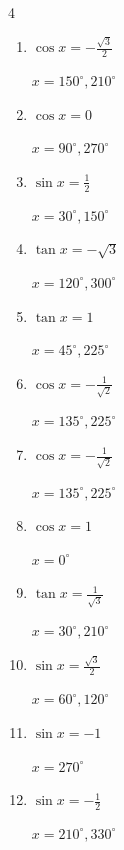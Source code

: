 \begin{multicols}{4}
\begin{enumerate}
  \item $\displaystyle \cos{x}  = -\frac{\sqrt{3}}{2}$

        $\displaystyle x = 150^{\circ} , 210^{\circ}$

  \item $\displaystyle \cos{x}  = 0$

        $\displaystyle x = 90^{\circ} , 270^{\circ}$

  \item $\displaystyle \sin{x}  = \frac{1}{2}$

        $\displaystyle x = 30^{\circ} , 150^{\circ}$

  \item $\displaystyle \tan{x}  = -\sqrt{3}$

        $\displaystyle x = 120^{\circ} , 300^{\circ}$

  \item $\displaystyle \tan{x}  = 1$

        $\displaystyle x = 45^{\circ} , 225^{\circ}$

  \item $\displaystyle \cos{x}  = -\frac{1}{\sqrt{2}}$

        $\displaystyle x = 135^{\circ} , 225^{\circ}$

  \item $\displaystyle \cos{x}  = -\frac{1}{\sqrt{2}}$

        $\displaystyle x = 135^{\circ} , 225^{\circ}$

  \item $\displaystyle \cos{x}  = 1$

        $\displaystyle x = 0^{\circ}$

  \item $\displaystyle \tan{x}  = \frac{1}{\sqrt{3}}$

        $\displaystyle x = 30^{\circ} , 210^{\circ}$

  \item $\displaystyle \sin{x}  = \frac{\sqrt{3}}{2}$

        $\displaystyle x = 60^{\circ} , 120^{\circ}$

  \item $\displaystyle \sin{x}  = -1$

        $\displaystyle x = 270^{\circ}$

  \item $\displaystyle \sin{x}  = -\frac{1}{2}$

        $\displaystyle x = 210^{\circ} , 330^{\circ}$


\end{enumerate}
\end{multicols}
